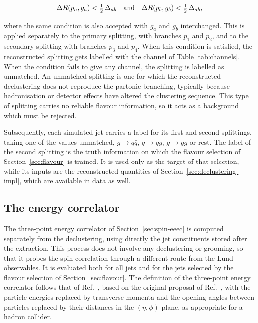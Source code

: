 \begin{equation}
  \Delta R(p_a, g_a) < \tfrac{1}{2}\,\Delta_{ab}
  \quad\text{and}\quad
  \Delta R(p_b, g_b) < \tfrac{1}{2}\,\Delta_{ab},
  \label{eq:splitmatch}
\end{equation}

where the same condition is also accepted with $g_a$ and $g_b$ interchanged. This is applied 
separately to the primary splitting, with branches $p_1$ and $p_2$, and to the secondary
splitting with branches $p_3$ and $p_4$. When this condition is satisfied, the reconstructed
splitting gets labelled with the channel of Table \ref{tab:channels}. When the condition fails
to give any channel, the splitting is labelled as unmatched. An unmatched splitting is
one for which the reconstructed declustering does not reproduce the partonic
branching, typically because hadronisation or detector effects have altered the
clustering sequence. This type of splitting carries no reliable flavour information,
so it acts as a background which must be rejected.

Subsequently, each simulated jet carries a label for its first and second splittings, taking one of the values unmatched, $g \to q\bar{q}$, $q \to qg$, $g \to gg$ or
rest. The label of the second splitting is the truth information on which the
flavour selection of Section~\ref{sec:flavour} is trained. It is used only as the
target of that selection, while its inputs are the reconstructed quantities of
Section~\ref{sec:declustering-impl}, which are available in data as well.

\subsection{The energy correlator}
\label{sec:eeec-impl}

The three-point energy correlator of Section~\ref{sec:spin-eeec} is computed
separately from the declustering, using directly the jet constituents stored after
the extraction. This process does not involve any declustering or grooming, so
that it probes the spin correlation through a different route from the Lund
observables. It is evaluated both for all jets and for the jets selected by the
flavour selection of Section~\ref{sec:flavour}. The definition of the three-point
energy correlator follows that of Ref.~\cite{Karlberg_2021}, based on the original
proposal of Ref.~\cite{Chen_2021}, with the particle energies replaced by
transverse momenta and the opening angles between particles replaced by their
distances in the $(\eta,\phi)$ plane, as appropriate for a hadron collider.


